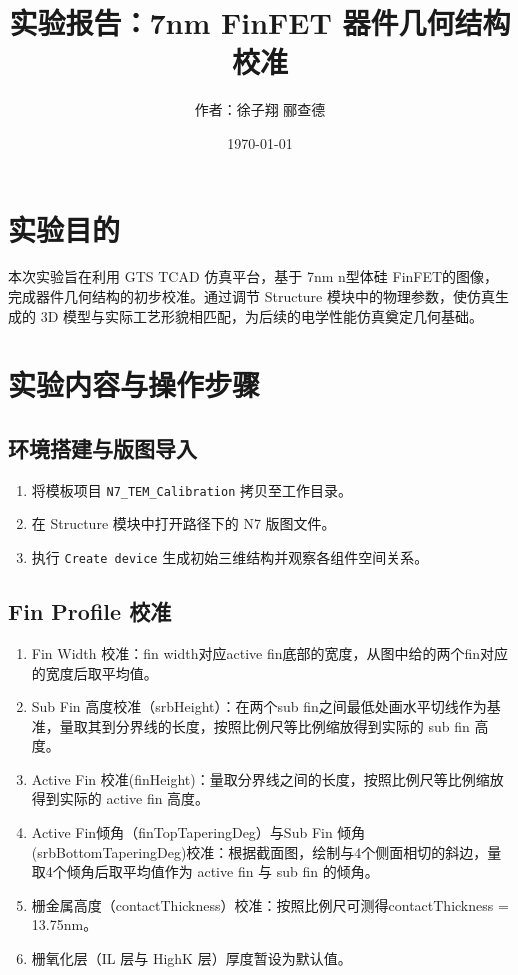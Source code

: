 \documentclass[12pt, a4paper, UTF8]{article}
\title{实验报告：7nm FinFET 器件几何结构校准}
\author{作者：徐子翔 \hspace{0.2cm} 郦查德}
\date{\today}
\begin{document}
\maketitle

\section{实验目的}
本次实验旨在利用 GTS TCAD 仿真平台，基于 7nm n型体硅 FinFET的图像，完成器件几何结构的初步校准。通过调节 Structure 模块中的物理参数，使仿真生成的 3D 模型与实际工艺形貌相匹配，为后续的电学性能仿真奠定几何基础。

\section{实验内容与操作步骤}

\subsection{环境搭建与版图导入}
\begin{enumerate}
    \item 将模板项目 \texttt{N7\_TEM\_Calibration} 拷贝至工作目录。
    \item 在 Structure 模块中打开路径下的 N7 版图文件。
    \item 执行 \texttt{Create device} 生成初始三维结构并观察各组件空间关系。
\end{enumerate}


\subsection{Fin Profile 校准}
\begin{enumerate}
    \item Fin Width 校准：fin width对应active fin底部的宽度，从图中给的两个fin对应的宽度后取平均值。
    \item Sub Fin 高度校准（srbHeight）：在两个sub fin之间最低处画水平切线作为基准，量取其到分界线的长度，按照比例尺等比例缩放得到实际的 sub fin 高度。
    \item Active Fin 校准(finHeight)：量取分界线之间的长度，按照比例尺等比例缩放得到实际的 active fin 高度。
    \item Active Fin倾角（finTopTaperingDeg）与Sub Fin 倾角(srbBottomTaperingDeg)校准：根据截面图，绘制与4个侧面相切的斜边，量取4个倾角后取平均值作为 active fin 与 sub fin 的倾角。
    \item 栅金属高度（contactThickness）校准：按照比例尺可测得contactThickness = 13.75nm。
    \item 栅氧化层（IL 层与 HighK 层）厚度暂设为默认值。
\end{enumerate}
\end{document}
